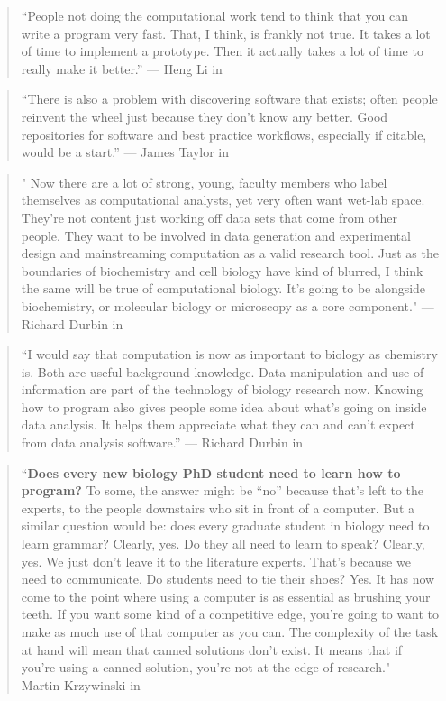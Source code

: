 \documentclass[]{tufte-book}
\begin{document}
\begin{quote}
``People not doing the computational work tend to think that you can write a
program very fast. That, I think, is frankly not true. It takes a lot of time to
implement a prototype. Then it actually takes a lot of time to really make it
better.'' --- Heng Li in \citep{altschul2013anatomy}
\end{quote}

\begin{quote}
``There is also a problem with discovering software that exists; often people
reinvent the wheel just because they don't know any better. Good repositories
for software and best practice workflows, especially if citable, would be a
start.'' --- James Taylor in \citep{altschul2013anatomy}
\end{quote}

\begin{quote}
" Now there are a lot of strong, young, faculty members who label themselves
as computational analysts, yet very often want wet-lab space. They're not
content just working off data sets that come from other people. They want to be
involved in data generation and experimental design and mainstreaming
computation as a valid research tool. Just as the boundaries of biochemistry and
cell biology have kind of blurred, I think the same will be true of
computational biology. It's going to be alongside biochemistry, or molecular
biology or microscopy as a core component." --- Richard Durbin in
\citep{altschul2013anatomy}
\end{quote}

\begin{quote}
``I would say that computation is now as important to biology as chemistry is.
Both are useful background knowledge. Data manipulation and use of information
are part of the technology of biology research now. Knowing how to program also
gives people some idea about what's going on inside data analysis. It helps them
appreciate what they can and can't expect from data analysis software.'' ---
Richard Durbin in \citep{altschul2013anatomy}
\end{quote}

\begin{quote}
``\textbf{Does every new biology PhD student need to learn how to program?} To some,
the answer might be ``no'' because that's left to the experts, to the people
downstairs who sit in front of a computer. But a similar question would be: does
every graduate student in biology need to learn grammar? Clearly, yes. Do they
all need to learn to speak? Clearly, yes. We just don't leave it to the
literature experts. That's because we need to communicate. Do students need to
tie their shoes? Yes. It has now come to the point where using a computer is as
essential as brushing your teeth. If you want some kind of a competitive edge,
you're going to want to make as much use of that computer as you can. The
complexity of the task at hand will mean that canned solutions don't exist. It
means that if you're using a canned solution, you're not at the edge of
research." --- Martin Krzywinski in \citep{altschul2013anatomy}
\end{quote}
\end{document}
